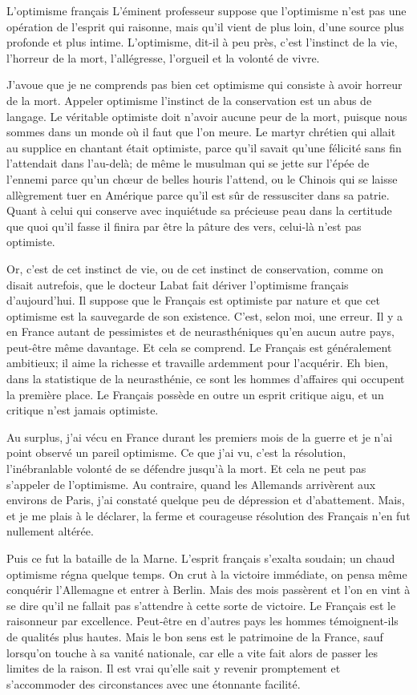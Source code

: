 \begin{chapter}{L'optimisme français}
L'éminent professeur suppose que l'optimisme n'est pas une opération de
l'esprit qui raisonne, mais qu'il vient de plus loin, d'une source plus
profonde et plus intime. L'optimisme, dit-il à peu près, c'est
l'instinct de la vie, l'horreur de la mort, l'allégresse, l'orgueil et
la volonté de vivre.

J'avoue que je ne comprends pas bien cet optimisme qui consiste à avoir
horreur de la mort. Appeler optimisme l'instinct de la conservation est
un abus de langage. Le véritable optimiste doit n'avoir aucune peur de
la mort, puisque nous sommes dans un monde où il faut que l'on meure. Le
martyr chrétien qui allait au supplice en chantant était optimiste,
parce qu'il savait qu'une félicité sans fin l'attendait dans l'au-delà;
de même le musulman qui se jette sur l'épée de l'ennemi parce qu'un
chœur de belles houris l'attend, ou le Chinois qui se laisse
allègrement tuer en Amérique parce qu'il est sûr de ressusciter dans sa
patrie. Quant à celui qui conserve avec inquiétude sa précieuse peau
dans la certitude que quoi qu'il fasse il finira par être la pâture des
vers, celui-là n'est pas optimiste.

Or, c'est de cet instinct de vie, ou de cet instinct de conservation,
comme on disait autrefois, que le docteur Labat fait dériver l'optimisme
français d'aujourd'hui. Il suppose que le Français est optimiste par
nature et que cet optimisme est la sauvegarde de son existence. C'est,
selon moi, une erreur. Il y a en France autant de pessimistes et de
neurasthéniques qu'en aucun autre pays, peut-être même davantage. Et
cela se comprend. Le Français est généralement ambitieux; il aime la
richesse et travaille ardemment pour l'acquérir. Eh bien, dans la
statistique de la neurasthénie, ce sont les hommes d'affaires qui
occupent la première place. Le Français possède en outre un esprit
critique aigu, et un critique n'est jamais optimiste.

Au surplus, j'ai vécu en France durant les premiers mois de la guerre et
je n'ai point observé un pareil optimisme. Ce que j'ai vu, c'est la
résolution, l'inébranlable volonté de se défendre jusqu'à la mort. Et
cela ne peut pas s'appeler de l'optimisme. Au contraire, quand les
Allemands arrivèrent aux environs de Paris, j'ai constaté quelque peu de
dépression et d'abattement. Mais, et je me plais à le déclarer, la
ferme et courageuse résolution des Français n'en fut nullement altérée.

Puis ce fut la bataille de la Marne. L'esprit français s'exalta soudain;
un chaud optimisme régna quelque temps. On crut à la victoire immédiate,
on pensa même conquérir l'Allemagne et entrer à Berlin. Mais des mois
passèrent et l'on en vint à se dire qu'il ne fallait pas s'attendre à
cette sorte de victoire. Le Français est le raisonneur par excellence.
Peut-être en d'autres pays les hommes témoignent-ils de qualités plus
hautes. Mais le bon sens est le patrimoine de la France, sauf lorsqu'on
touche à sa vanité nationale, car elle a vite fait alors de passer les
limites de la raison. Il est vrai qu'elle sait y revenir promptement et
s'accommoder des circonstances avec une étonnante facilité.


\end{chapter}
